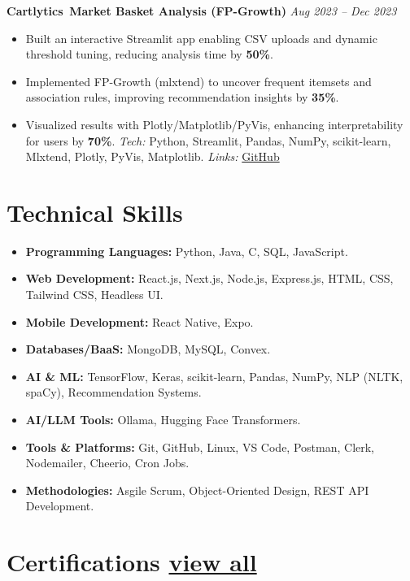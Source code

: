 \documentclass[10pt,a4paper]{article}
\begin{document}
	\textbf{Cartlytics \textbar \,Market Basket Analysis (FP-Growth)} \hfill \textit{Aug 2023 -- Dec 2023}
	\begin{itemize}
		\item Built an interactive Streamlit app enabling CSV uploads and dynamic threshold tuning, reducing analysis time by \textbf{50\%}.  
		\item Implemented FP-Growth (mlxtend) to uncover frequent itemsets and association rules, improving recommendation insights by \textbf{35\%}.  
		\item Visualized results with Plotly/Matplotlib/PyVis, enhancing interpretability for users by \textbf{70\%}.  
		\emph{Tech:} Python, Streamlit, Pandas, NumPy, scikit-learn, Mlxtend, Plotly, PyVis, Matplotlib.  
		\emph{Links:} \href{https://github.com/ValupadasuSaiabbhiram/Cartlytics}{GitHub}
	\end{itemize}
	
	\section*{Technical Skills}
	
	\begin{itemize}[leftmargin=*]
 
	\item \textbf{Programming Languages:} Python, Java, C, SQL, JavaScript.
	\item \textbf{Web Development:} React.js, Next.js, Node.js, Express.js, HTML, CSS, Tailwind CSS, Headless UI.
	\item \textbf{Mobile Development:} React Native, Expo.
	\item \textbf{Databases/BaaS:} MongoDB, MySQL, Convex.
	\item \textbf{AI \& ML:} TensorFlow, Keras, scikit-learn, Pandas, NumPy, NLP (NLTK, spaCy), Recommendation Systems.
	\item \textbf{AI/LLM Tools:} Ollama, Hugging Face Transformers.
	\item \textbf{Tools \& Platforms:} Git, GitHub, Linux, VS Code, Postman, Clerk, Nodemailer, Cheerio, Cron Jobs.
	\item \textbf{Methodologies:} Asgile Scrum, Object-Oriented Design, REST API Development.
	\end{itemize}
	

	\section*{Certifications \hfill \small\href{https://github.com/ValupadasuSaiabbhiram/Certificates}{view all}}
	
\end{document}
